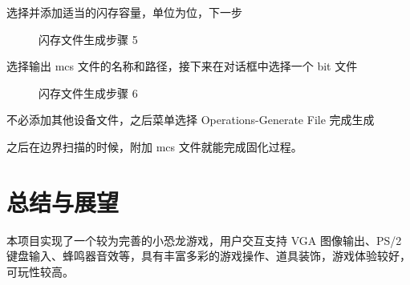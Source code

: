 \documentclass[hyperref,UTF8,12pt,a4paper]{ctexart}
\begin{document}
选择并添加适当的闪存容量，单位为位，下一步

\begin{figure}[H]
\centering
{}
\caption{闪存文件生成步骤 5}
\end{figure}

选择输出 mcs 文件的名称和路径，接下来在对话框中选择一个 bit 文件

\begin{figure}[H]
\centering
{}
\caption{闪存文件生成步骤 6}
\end{figure}

不必添加其他设备文件，之后菜单选择 Operations-Generate File 完成生成

之后在边界扫描的时候，附加 mcs 文件就能完成固化过程。

\hypertarget{ux603bux7ed3ux4e0eux5c55ux671b}{%
\section{总结与展望}\label{ux603bux7ed3ux4e0eux5c55ux671b}}

本项目实现了一个较为完善的小恐龙游戏，用户交互支持 VGA 图像输出、PS/2
键盘输入、蜂鸣器音效等，具有丰富多彩的游戏操作、道具装饰，游戏体验较好，可玩性较高。
\end{document}
